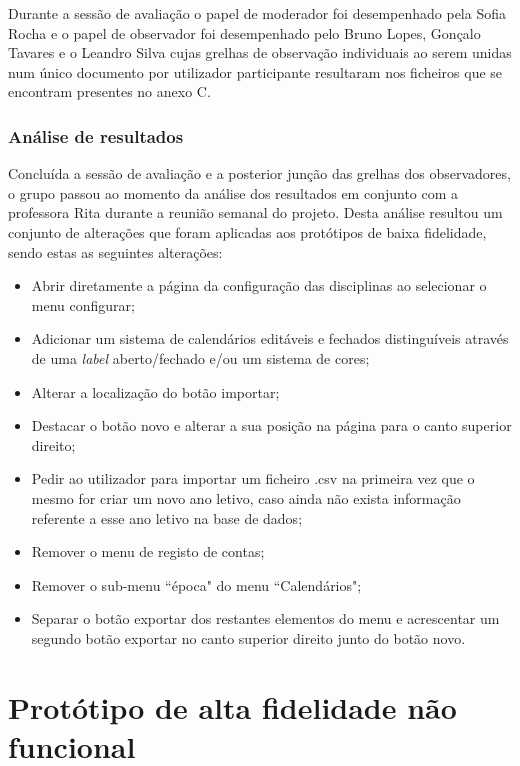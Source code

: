 \documentclass[11pt, twoside]{report}
\begin{document}
Durante a sessão de avaliação o papel de moderador foi desempenhado pela Sofia Rocha e o papel de observador foi desempenhado pelo Bruno Lopes, Gonçalo Tavares e o Leandro Silva cujas grelhas de observação individuais ao serem unidas num único documento por utilizador participante resultaram nos ficheiros que se encontram presentes no anexo C.

	

	\subsubsection{Análise de resultados}
Concluída a sessão de avaliação e a posterior junção das grelhas dos observadores, o grupo passou ao momento da análise dos resultados em conjunto com a professora Rita durante a reunião semanal do projeto. Desta análise resultou um conjunto de alterações que foram aplicadas aos protótipos de baixa fidelidade, sendo estas as seguintes alterações:

\begin{itemize}
	\item Abrir diretamente a página da configuração das disciplinas ao selecionar o menu configurar;
	\item Adicionar um sistema de calendários editáveis e fechados distinguíveis através de uma \textit{label} aberto/fechado e/ou um sistema de cores;
	\item Alterar a localização do botão importar;
	\item Destacar o botão novo e alterar a sua posição na página para o canto superior direito;
	\item Pedir ao utilizador para importar um ficheiro .csv na primeira vez que o mesmo for criar um novo ano letivo, caso ainda não exista informação referente a esse ano letivo na base de dados;
	\item Remover o menu de registo de contas;
	\item Remover o sub-menu ``época" do menu ``Calendários";		
	\item Separar o botão exportar dos restantes elementos do menu e acrescentar um segundo botão exportar no canto superior direito junto do botão novo.

\end{itemize}

	\section{Protótipo de alta fidelidade não funcional}
	\label{prototipoAFNF}
	
\end{document}
